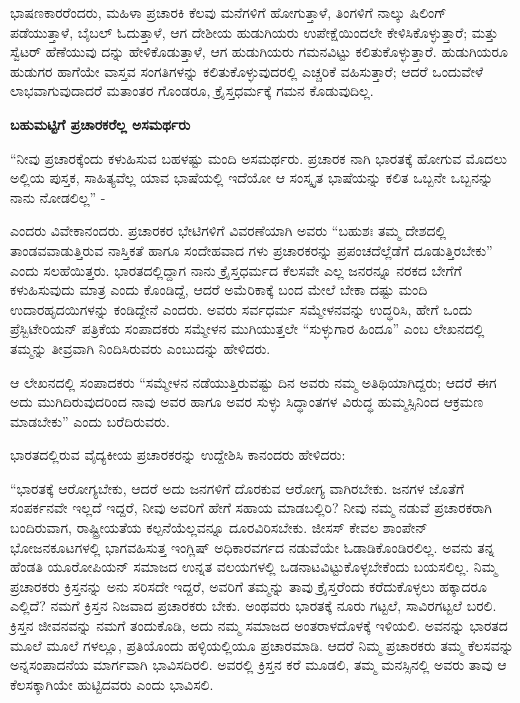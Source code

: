 ಭಾಷಣಕಾರರೆಂದರು, ಮಹಿಳಾ ಪ್ರಚಾರಕಿ ಕೆಲವು ಮನೆಗಳಿಗೆ ಹೋಗುತ್ತಾಳೆ, ತಿಂಗಳಿಗೆ ನಾಲ್ಕು ಷಿಲಿಂಗ್ ಪಡೆಯುತ್ತಾಳೆ, ಬೈಬಲ್ ಓದುತ್ತಾಳೆ, ಆಗ ದೇಶೀಯ ಹುಡುಗಿಯರು ಉಪೇಕ್ಷೆಯಿಂದಲೇ ಕೇಳಿಸಿಕೊಳ್ಳುತ್ತಾರೆ; ಮತ್ತು ಸ್ವೆಟರ್ ಹೆಣೆಯುವು ದನ್ನು ಹೇಳಿಕೊಡುತ್ತಾಳೆ, ಆಗ ಹುಡುಗಿಯರು ಗಮನವಿಟ್ಟು ಕಲಿತುಕೊಳ್ಳುತ್ತಾರೆ. ಹುಡುಗಿಯರೂ ಹುಡುಗರ ಹಾಗೆಯೇ ವಾಸ್ತವ ಸಂಗತಿಗಳನ್ನು ಕಲಿತುಕೊಳ್ಳುವುದರಲ್ಲಿ ಎಚ್ಚರಿಕೆ ವಹಿಸುತ್ತಾರೆ; ಆದರೆ ಒಂದುವೇಳೆ ಲಾಭವಾಗುವುದಾದರೆ ಮತಾಂತರ ಗೊಂಡರೂ, ಕ್ರೈಸ್ತಧರ್ಮಕ್ಕೆ ಗಮನ ಕೊಡುವುದಿಲ್ಲ.

\begin{center}
\textbf{ಬಹುಮಟ್ಟಿಗೆ ಪ್ರಚಾರಕರೆಲ್ಲ ಅಸಮರ್ಥರು}
\end{center}

“ನೀವು ಪ್ರಚಾರಕ್ಕೆಂದು ಕಳುಹಿಸುವ ಬಹಳಷ್ಟು ಮಂದಿ ಅಸಮರ್ಥರು. ಪ್ರಚಾರಕ ನಾಗಿ ಭಾರತಕ್ಕೆ ಹೋಗುವ ಮೊದಲು ಅಲ್ಲಿಯ ಪುಸ್ತಕ, ಸಾಹಿತ್ಯವೆಲ್ಲ ಯಾವ ಭಾಷೆಯಲ್ಲಿ ಇದೆಯೋ ಆ ಸಂಸ್ಕೃತ ಭಾಷೆಯನ್ನು ಕಲಿತ ಒಬ್ಬನೇ ಒಬ್ಬನನ್ನು ನಾನು ನೋಡಲಿಲ್ಲ” -

ಎಂದರು ವಿವೇಕಾನಂದರು. ಪ್ರಚಾರಕರ ಭೇಟಿಗಳಿಗೆ ವಿವರಣೆಯಾಗಿ ಅವರು “ಬಹುಶಃ ತಮ್ಮ ದೇಶದಲ್ಲಿ ತಾಂಡವವಾಡುತ್ತಿರುವ ನಾಸ್ತಿಕತೆ ಹಾಗೂ ಸಂದೇಹವಾದ ಗಳು ಪ್ರಚಾರಕರನ್ನು ಪ್ರಪಂಚದೆಲ್ಲೆಡೆಗೆ ದೂಡುತ್ತಿರಬೇಕು” ಎಂದು ಸಲಹೆಯಿತ್ತರು. ಭಾರತದಲ್ಲಿದ್ದಾಗ ನಾನು ಕ್ರೈಸ್ತಧರ್ಮದ ಕೆಲಸವೇ ಎಲ್ಲ ಜನರನ್ನೂ ನರಕದ ಬೇಗೆಗೆ ಕಳುಹಿಸುವುದು ಮಾತ್ರ ಎಂದು ಕೊಂಡಿದ್ದೆ, ಆದರೆ ಅಮೆರಿಕಾಕ್ಕೆ ಬಂದ ಮೇಲೆ ಬೇಕಾ ದಷ್ಟು ಮಂದಿ ಉದಾರಹೃದಯಿಗಳನ್ನು ಕಂಡಿದ್ದೇನೆ ಎಂದರು. ಅವರು ಸರ್ವಧರ್ಮ ಸಮ್ಮೇಳನವನ್ನು ಉದ್ಧರಿಸಿ, ಹೇಗೆ ಒಂದು ಪ್ರೆಸ್ಬಿಟೇರಿಯನ್ ಪತ್ರಿಕೆಯ ಸಂಪಾದಕರು ಸಮ್ಮೇಳನ ಮುಗಿಯುತ್ತಲೇ “ಸುಳ್ಳುಗಾರ ಹಿಂದೂ” ಎಂಬ ಲೇಖನದಲ್ಲಿ ತಮ್ಮನ್ನು ತೀವ್ರವಾಗಿ ನಿಂದಿಸಿರುವರು ಎಂಬುದನ್ನು ಹೇಳಿದರು.

ಆ ಲೇಖನದಲ್ಲಿ ಸಂಪಾದಕರು “ಸಮ್ಮೇಳನ ನಡೆಯುತ್ತಿರುವಷ್ಟು ದಿನ ಅವರು ನಮ್ಮ ಅತಿಥಿಯಾಗಿದ್ದರು; ಆದರೆ ಈಗ ಅದು ಮುಗಿದಿರುವುದರಿಂದ ನಾವು ಅವರ ಹಾಗೂ ಅವರ ಸುಳ್ಳು ಸಿದ್ಧಾಂತಗಳ ವಿರುದ್ಧ ಹುಮ್ಮಸ್ಸಿನಿಂದ ಆಕ್ರಮಣ ಮಾಡಬೇಕು” ಎಂದು ಬರೆದಿರುವರು.

ಭಾರತದಲ್ಲಿರುವ ವೈದ್ಯಕೀಯ ಪ್ರಚಾರಕರನ್ನು ಉದ್ದೇಶಿಸಿ ಕಾನಂದರು ಹೇಳಿದರು:

“ಭಾರತಕ್ಕೆ ಆರೋಗ್ಯಬೇಕು, ಆದರೆ ಅದು ಜನಗಳಿಗೆ ದೊರಕುವ ಆರೋಗ್ಯ ವಾಗಿರಬೇಕು. ಜನಗಳ ಜೊತೆಗೆ ಸಂಪರ್ಕನವೇ ಇಲ್ಲದೆ ಇದ್ದರೆ, ನೀವು ಅವರಿಗೆ ಹೇಗೆ ಸಹಾಯ ಮಾಡಬಲ್ಲಿರಿ? ನೀವು ನಮ್ಮ ನಡುವೆ ಪ್ರಚಾರಕರಾಗಿ ಬಂದಿರುವಾಗ, ರಾಷ್ಟ್ರೀಯತೆಯ ಕಲ್ಪನೆಯೆಲ್ಲವನ್ನೂ ದೂರವಿರಿಸಬೇಕು. ಜೀಸಸ್ ಕೇವಲ ಶಾಂಪೇನ್ ಭೋಜನಕೂಟಗಳಲ್ಲಿ ಭಾಗವಹಿಸುತ್ತ ಇಂಗ್ಲಿಷ್ ಅಧಿಕಾರವರ್ಗದ ನಡುವೆಯೇ ಓಡಾಡಿಕೊಂಡಿರಲಿಲ್ಲ. ಅವನು ತನ್ನ ಹೆಂಡತಿ ಯೂರೋಪಿಯನ್ ಸಮಾಜದ ಉನ್ನತ ವಲಯಗಳಲ್ಲಿ ಒಡನಾಟವಿಟ್ಟುಕೊಳ್ಳಬೇಕೆಂದು ಬಯಸಲಿಲ್ಲ. ನಿಮ್ಮ ಪ್ರಚಾರಕರು ಕ್ರಿಸ್ತನನ್ನು ಅನು ಸರಿಸದೇ ಇದ್ದರೆ, ಅವರಿಗೆ ತಮ್ಮನ್ನು ತಾವು ಕ್ರೈಸ್ತರೆಂದು ಕರೆದುಕೊಳ್ಳಲು ಹಕ್ಕಾದರೂ ಎಲ್ಲಿದೆ? ನಮಗೆ ಕ್ರಿಸ್ತನ ನಿಜವಾದ ಪ್ರಚಾರಕರು ಬೇಕು. ಅಂಥವರು ಭಾರತಕ್ಕೆ ನೂರು ಗಟ್ಟಲೆ, ಸಾವಿರಗಟ್ಟಲೆ ಬರಲಿ. ಕ್ರಿಸ್ತನ ಜೀವನವನ್ನು ನಮಗೆ ತಂದುಕೊಡಿ, ಅದು ನಮ್ಮ ಸಮಾಜದ ಅಂತರಾಳದೊಳಕ್ಕೆ ಇಳಿಯಲಿ. ಅವನನ್ನು ಭಾರತದ ಮೂಲೆ ಮೂಲೆ ಗಳಲ್ಲೂ, ಪ್ರತಿಯೊಂದು ಹಳ್ಳಿಯಲ್ಲಿಯೂ ಪ್ರಚಾರಮಾಡಿ. ಆದರೆ ನಿಮ್ಮ ಪ್ರಚಾರಕರು ತಮ್ಮ ಕೆಲಸವನ್ನು ಅನ್ನಸಂಪಾದನೆಯ ಮಾರ್ಗವಾಗಿ ಭಾವಿಸದಿರಲಿ. ಅವರಲ್ಲಿ ಕ್ರಿಸ್ತನ ಕರೆ ಮೂಡಲಿ, ತಮ್ಮ ಮನಸ್ಸಿನಲ್ಲಿ ಅವರು ತಾವು ಆ ಕೆಲಸಕ್ಕಾಗಿಯೇ ಹುಟ್ಟಿದವರು ಎಂದು ಭಾವಿಸಲಿ.

